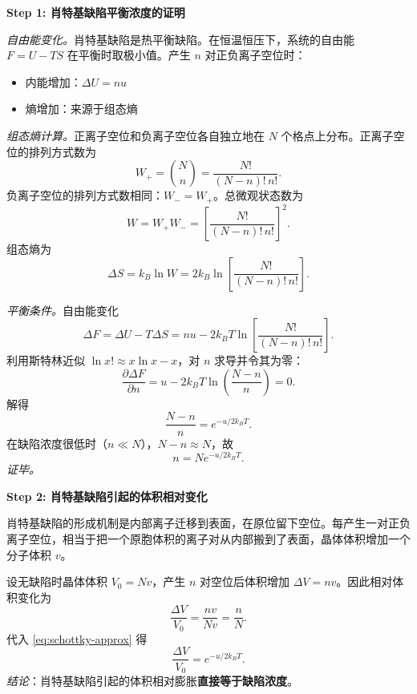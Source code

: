 \begin{derivationbox}[标准解题过程]
\textbf{Step 1: 肖特基缺陷平衡浓度的证明}

\textit{自由能变化。}肖特基缺陷是热平衡缺陷。在恒温恒压下，系统的自由能 $F = U - TS$ 在平衡时取极小值。产生 $n$ 对正负离子空位时：
\begin{itemize}
    \item 内能增加：$\Delta U = nu$
    \item 熵增加：来源于组态熵
\end{itemize}

\textit{组态熵计算。}正离子空位和负离子空位各自独立地在 $N$ 个格点上分布。正离子空位的排列方式数为
\begin{equation}
W_+ = \binom{N}{n} = \frac{N!}{(N-n)!\,n!}.
\end{equation}
负离子空位的排列方式数相同：$W_- = W_+$。总微观状态数为
\begin{equation}
W = W_+ W_- = \left[\frac{N!}{(N-n)!\,n!}\right]^2.
\label{eq:schottky-W}
\end{equation}
组态熵为
\begin{equation}
\Delta S = k_{\!B}\ln W = 2k_{\!B}\ln\!\left[\frac{N!}{(N-n)!\,n!}\right].
\end{equation}

\textit{平衡条件。}自由能变化
\begin{equation}
\Delta F = \Delta U - T\Delta S = nu - 2k_{\!B}T\ln\!\left[\frac{N!}{(N-n)!\,n!}\right].
\end{equation}
利用斯特林近似 $\ln x! \approx x\ln x - x$，对 $n$ 求导并令其为零：
\begin{equation}
\frac{\partial\Delta F}{\partial n} = u - 2k_{\!B}T\ln\!\left(\frac{N-n}{n}\right) = 0.
\end{equation}
解得
\begin{equation}
\frac{N-n}{n} = e^{-u/2k_{\!B}T}.
\end{equation}
在缺陷浓度很低时（$n\ll N$），$N-n\approx N$，故
\begin{equation}
\boxed{n = N e^{-u/2k_{\!B}T}.}
\label{eq:schottky-approx}
\end{equation}
\textit{证毕。}

\textbf{Step 2: 肖特基缺陷引起的体积相对变化}

肖特基缺陷的形成机制是内部离子迁移到表面，在原位留下空位。每产生一对正负离子空位，相当于把一个原胞体积的离子对从内部搬到了表面，晶体体积增加一个分子体积 $v$。

设无缺陷时晶体体积 $V_0 = Nv$，产生 $n$ 对空位后体积增加 $\Delta V = nv$。因此相对体积变化为
\begin{equation}
\frac{\Delta V}{V_0} = \frac{nv}{Nv} = \frac{n}{N}.
\end{equation}
代入 \eqref{eq:schottky-approx} 得
\begin{equation}
\boxed{\frac{\Delta V}{V_0} = e^{-u/2k_{\!B}T}.}
\end{equation}
\textit{结论}：肖特基缺陷引起的体积相对膨胀\textbf{直接等于缺陷浓度}。


\end{derivationbox}
